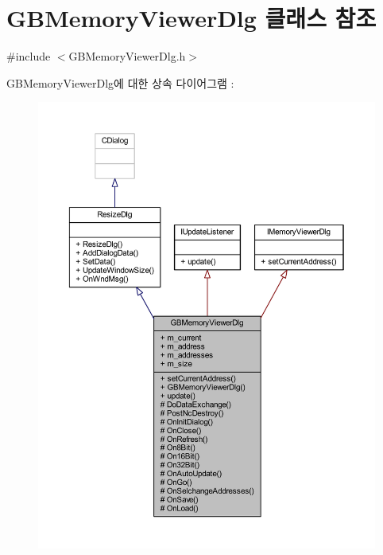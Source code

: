 \hypertarget{class_g_b_memory_viewer_dlg}{}\section{G\+B\+Memory\+Viewer\+Dlg 클래스 참조}
\label{class_g_b_memory_viewer_dlg}


{\ttfamily \#include $<$G\+B\+Memory\+Viewer\+Dlg.\+h$>$}



G\+B\+Memory\+Viewer\+Dlg에 대한 상속 다이어그램 \+: \nopagebreak
\begin{figure}[H]
\begin{center}
\leavevmode
\includegraphics[width=350pt]{class_g_b_memory_viewer_dlg__inherit__graph}
\end{center}
\end{figure}


